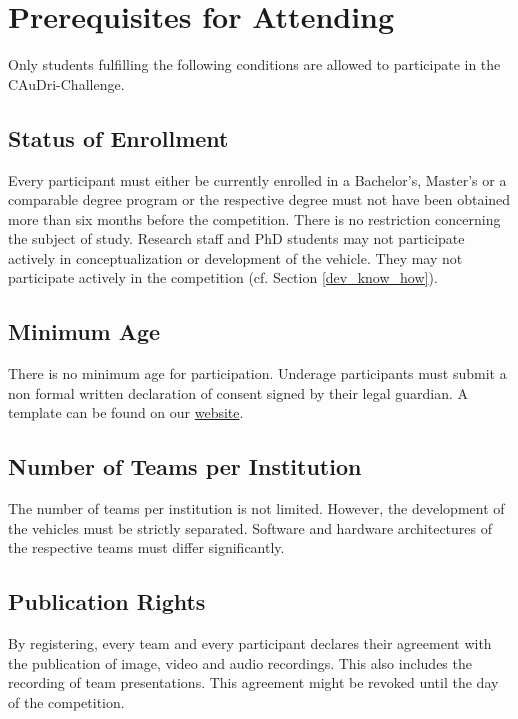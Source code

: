 \chapter{Prerequisites for Attending}

Only students fulfilling the following conditions are allowed to participate in
the CAuDri-Challenge.

\section{Status of Enrollment}

Every participant must either be currently enrolled in a Bachelor’s, Master’s
or a comparable degree program or the respective degree must not have been
obtained more than six months before the competition. There is no restriction
concerning the subject of study. Research staff and PhD students may not
participate actively in conceptualization or development of the vehicle. They
may not participate actively in the competition (cf. Section
\ref{dev_know_how}).


\section{Minimum Age}

There is no minimum age for participation. Underage participants must submit a
non formal written declaration of consent signed by their legal guardian. A
template can be found on our
\href{https://caudri-challenge.de/documents/Einverst%C3%A4ndniserkl%C3%A4rung_Minderj%C3%A4hrige.pdf}{website}.
\section{Number of Teams per Institution}

The number of teams per institution is not limited. However, the development of
the vehicles must be strictly separated. Software and hardware architectures of
the respective teams must differ significantly.

\section{Publication Rights}

By registering, every team and every participant declares their agreement with
the publication of image, video and audio recordings. This also includes the
recording of team presentations. This agreement might be revoked until the day
of the competition.